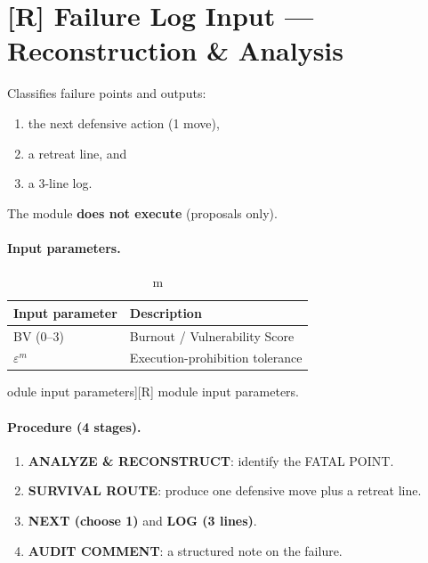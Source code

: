 
\section{[R] Failure Log Input --- Reconstruction \& Analysis}
\label{sec:secretary-R}

Classifies failure points and outputs:

\begin{enumerate}
\item the next defensive action (1 move),
\item a retreat line, and
\item a 3-line log.
\end{enumerate}

\noindent
The module \textbf{does not execute} (proposals only).

\paragraph{Input parameters.}

\begin{table}[ht]
\centering
\small
\begin{tabularx}{0.85\linewidth}{lX}
\toprule
\textbf{Input parameter} & \textbf{Description} \\
\midrule
BV ($0$--$3$) & Burnout / Vulnerability Score \\
$\varepsilon^m$ & Execution-prohibition tolerance \\
\bottomrule
\end{tabularx}
\caption[\,[R] module input parameters]{[R] module input
parameters.}
\label{tab:R-input}
\end{table}

\paragraph{Procedure (4 stages).}

\begin{enumerate}
\item \textbf{ANALYZE \& RECONSTRUCT}: identify the FATAL POINT.
\item \textbf{SURVIVAL ROUTE}: produce one defensive move plus a
retreat line.
\item \textbf{NEXT (choose 1)} and \textbf{LOG (3 lines)}.
\item \textbf{AUDIT COMMENT}: a structured note on the failure.
\end{enumerate}

